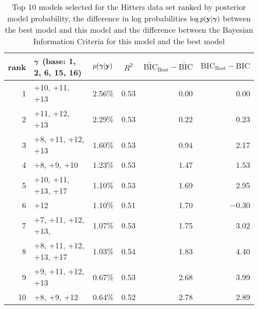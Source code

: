 \begin{table}[h]
	\begin{center}
		\begin{tabular}{r|l|l|c|r|r}
			rank & ${\boldsymbol \gamma}$ (base: 1, 2, 6, 15, 16) & $p({\boldsymbol \gamma}|{\bf y})$ & $R^2$ & $\widetilde{\text{BIC}}_\text{Best} - \widetilde{\text{BIC}}$ & $\text{BIC}_\text{Best} - \text{BIC}$ \\
			\hline
			1  &  +10, +11, +13&  2.56\%&  0.53&  0.00&  0.00\\
			2  &  +11, +12, +13&  2.29\%&  0.53&  0.22&  0.23\\
			3  &  +8, +11, +12, +13&  1.60\%&  0.53&  0.94&  2.17\\
			4  &  +8, +9, +10&  1.23\%&  0.53&  1.47&  1.53\\
			5  &  +10, +11, +13, +17&  1.10\%&  0.53&  1.69&  2.95\\
			6  &  +12&  1.10\%&  0.51&  1.70&  $-$0.30\\
			7  &  +7, +11, +12, +13,&  1.07\%&  0.53&  1.75&  3.02\\
			8  &  +8, +11, +12, +13, +17&  1.03\%&  0.54&  1.83&  4.40\\
			9  &  +9, +11, +12, +13&  0.67\%&  0.53&  2.68&  3.99\\
			10 &  +8, +9, +12&  0.64\%&  0.52&  2.78&  2.89\\
		\end{tabular}
		
	\end{center}
	
	\caption{Top 10 models selected for the Hitters data set ranked by posterior model probability, the difference
		in log probabilities $\log p({\bf y}|{\boldsymbol \gamma})$ between the best model and this model and the difference
		between the Bayesian Information Criteria for this model and the best model}
	\label{tab:numerical_results_hitters}
\end{table}
